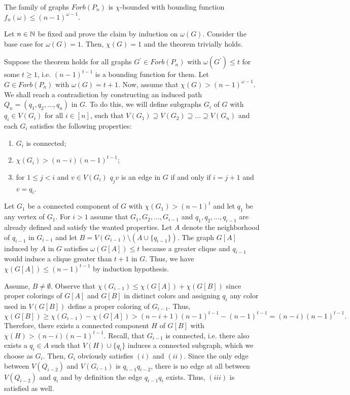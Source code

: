 \begin{thm}
The family of graphs $\textit{Forb}(P_n)$ is $\chi$-bounded with bounding function $f_n(\omega )\leq (n-1)^{\omega - 1}$.
\end{thm}

\begin{prf}
Let $n\in\mathbb{N}$ be fixed and prove the claim by induction on $\omega (G)$. Consider the base case for $\omega (G) =1$. Then, $\chi (G) = 1$ and the theorem trivially holds.

Suppose the theorem holds for all graphs $G^\prime\in\textit{Forb}(P_n)$ with $\omega (G^\prime ) \leq t$ for some $t\geq 1$, i.e. $(n-1)^{t-1}$ is a bounding function for them. Let $G\in\textit{Forb}(P_n)$ with $\omega (G) = t + 1$. Now, assume that $\chi (G) > (n-1)^{\omega - 1}$. We shall reach a contradiction by constructing an induced path $Q_n=(q_1,q_2,\dots ,q_n)$ in $G$. To do this, we will define subgraphs $G_i$ of $G$ with $q_i\in V(G_i)$ for all $i\in [n]$, such that $V(G_1)\supseteq V(G_2)\supseteq \dots\supseteq V(G_n)$ and each $G_i$ satisfies the following properties:
\begin{enumerate}
\item $G_i$ is connected;
\item $\chi (G_i) > (n-i)(n-1)^{t-1}$;
\item for $1\leq j<i$ and $v\in V(G_i)$ $q_jv$ is an edge in $G$ if and only if $i=j+1$ and $v = q_i$.
\end{enumerate}
Let $G_1$ be a connected component of $G$ with $\chi (G_1) >(n-1)^t$ and let $q_1$ be any vertex of $G_1$. For $i>1$ assume that $G_1,G_2,\dots , G_{i-1}$ and $q_1,q_2,\dots , q_{i-1}$ are already defined and satisfy the wanted properties. Let $A$ denote the neighborhood of $q_{i-1}$ in $G_{i-1}$ and  let $B=V(G_{i-1})\setminus (A\cup\{q_{i-1}\})$. The graph $G[A]$ induced by $A$ in $G$ satisfies $\omega (G[A])\leq t$ because a greater clique and $q_{i-1}$ would induce a clique greater than $t+1$ in $G$. Thus, we have $\chi (G[A])\leq (n-1)^{t-1}$ by induction hypothesis.

Assume, $B\neq\emptyset$. Observe that $\chi (G_{i-1})\leq \chi (G[A]) + \chi (G[B])$ since proper colorings of $G[A]$ and $G[B]$ in distinct colors and assigning $q_i$ any color used in $V(G[B])$ define a proper coloring of $G_{i-1}$. Thus, \[\chi (G[B])\geq \chi (G_{i-1})-\chi (G[A])>(n-i+1)(n-1)^{t-1}-(n-1)^{t-1}=(n-i)(n-1)^{t-1}.\]
Therefore, there exists a connected component $H$ of $G[B]$ with $\chi (H)>(n-i)(n-1)^{t-1}$. Recall, that $G_{i-1}$ is connected, i.e. there also exists a $q_i\in A$ such that $V(H)\cup \{q_i\}$ induces a connected subgraph, which we choose as $G_i$. Then,  $G_i$ obviously satisfies $(i)$ and $(ii)$. Since the only edge between $V(Q_{i-2})$ and $V(G_{i-1})$ is $q_{i-1}q_{i-2}$, there is no edge at all between $V(Q_{i-2})$ and $q_i$ and by definition the edge $q_{i-1}q_i$ exists. Thus, $(iii)$ is satisfied as well. 


\end{prf}
